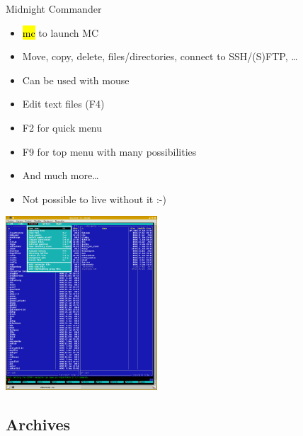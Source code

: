 \documentclass[compress, ucs, xelatex, 11pt, xcolor=svgnames,
  hyperref={
    bookmarks=true,
    unicode=true,
    colorlinks=true,
    pdftitle={Linux, command line and MetaCentrum},
    plainpages=false,
    pdfauthor={Vojtech Zeisek},
    pdfsubject={Course about use of Linux command line, writing shell scripts and using MetaCentrum of CESNET},
    pdfcreator={XeLaTeX, http://www.xelatex.org/},
    pdfkeywords={Linux, GNU, BASH, shell, command line, MetaCentrum},
    linkcolor=Sienna,
    anchorcolor=black,
    citecolor=green,
    filecolor=magenta,
    menucolor=Sienna,
    urlcolor=cyan,
    pdftex},
  url={hyphens, lowtilde} %
  ]{beamer}
\renewcommand{\texttt}[1]{\hl{\ttfamily #1}}
\begin{document}
\begin{frame}{Midnight Commander}
\begin{multicols}{2}
\begin{itemize}
  \item \texttt{mc} to launch MC
  \item Move, copy, delete, files/directories, connect to SSH/(S)FTP, \ldots
  \item Can be used with mouse
  \item Edit text files (F4)
  \item F2 for quick menu
  \item F9 for top menu with many possibilities
  \item And much more\ldots
  \item Not possible to live without it :-)
\end{itemize}
\includegraphics[height=6.5cm]{mc.png}
\end{multicols}
\end{frame}

\subsection{Archives}
\end{document}
